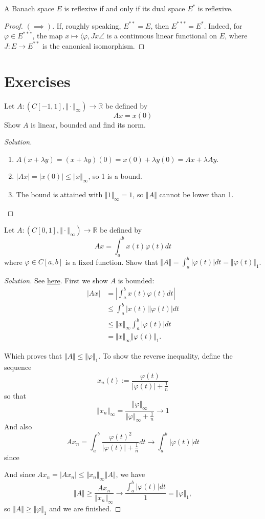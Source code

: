\documentclass{article}
\theoremstyle{definition}
\numberwithin{equation}{section}
\newcommand{\R}{\mathbb{R}}
\begin{document}
\begin{coro}
	A Banach space $E$ is reflexive if and only if its dual space $E^*$ is reflexive.
\end{coro}
\begin{proof}\leavevmode
	$(\implies)$. If, roughly speaking, $E^{**}=E$, then $E^{***}=E^*$. Indeed, for $\varphi\in E^{***}$, the map $x\mapsto\langle\varphi,Jx\angle$ is a continuous linear functional on $E$, where $J:E\to E^{**}$ is the canonical isomorphism.
\end{proof}
\iffalse
\clearpage
\section{Exercises}
\begin{exer}
	Let $A:(C[-1,1],\Vert\cdot\Vert_\infty)\to\R$ be defined by
	\[Ax=x(0)\]
	Show $A$ is linear, bounded and find its norm.
\end{exer}
\begin{proof}[Solution]\leavevmode
	\begin{enumerate}
		\item $A(x+\lambda y)=(x+\lambda y)(0)=x(0)+\lambda y(0)=Ax+\lambda Ay$.
		\item $|Ax|=|x(0)|\leq\Vert x\Vert_\infty$, so 1 is a bound.
		\item The bound is attained with $\Vert 1\Vert_\infty=1$, so $\Vert A\Vert$ cannot be lower than 1.
	\end{enumerate}
\end{proof}
\begin{exer}
	Let $A:(C[0,1],\Vert\cdot\Vert_\infty)\to\R$ be defined by
	\[Ax=\int_a^bx(t)\varphi(t)dt\]
	where $\varphi\in C[a,b]$ is a fixed function. Show that $\Vert A\Vert=\int_a^b|\varphi(t)|dt=\Vert\varphi(t)\Vert_1$.
\end{exer}
\begin{proof}[Solution] See \href{https://math.stackexchange.com/questions/338758/norm-of-the-linear-functional}{here}.
	First we show $A$ is bounded:
	\begin{align*}
		|Ax|&=\left|\int_a^bx(t)\varphi(t)dt\right|\\
		&\leq\int_a^b|x(t)||\varphi(t)|dt\\
		&\leq\Vert x\Vert_\infty\int_a^b|\varphi(t)|dt\\
		&=\Vert x\Vert_\infty\Vert\varphi(t)\Vert_1.
	\end{align*}

Which proves that $\Vert A\Vert\leq\Vert\varphi\Vert_1$. To show the reverse inequality, define the sequence
\[x_n(t):=\frac{\varphi(t)}{|\varphi(t)|+\frac{1}{n}}\]
{\color{orange}so that}
\[\Vert x_n\Vert_\infty=\frac{\Vert\varphi\Vert_\infty}{\Vert\varphi\Vert_\infty+\frac{1}{n}}\longrightarrow1\]
And also
\[Ax_n=\int_a^b\frac{\varphi(t)^2}{|\varphi(t)|+\frac{1}{n}}dt \longrightarrow \int_a^b|\varphi(t)|dt\]
{\color{orange}since}

And since $Ax_n=|Ax_n|\leq\Vert x_n\Vert_\infty\Vert A\Vert$, we have
\[\Vert A\Vert\geq\frac{Ax_n}{\Vert x_n\Vert_\infty}\longrightarrow\frac{\int_a^b|\varphi(t)|dt}{1}=\Vert\varphi\Vert_1,\]
so $\Vert A\Vert\geq\Vert\varphi\Vert_1$ and we are finished.

\end{proof}
\end{document}
